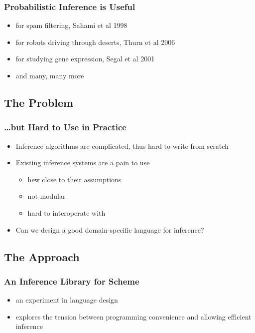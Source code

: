 \documentclass{beamer}
\begin{document}
\begin{frame}
  \frametitle{Probabilistic Inference is Useful}

  \begin{itemize}
  \item for spam filtering, Sahami et al 1998
  \item for robots driving through deserts, Thurn et al 2006
  \item for studying gene expression, Segal et al 2001
  \item and many, many more
  \end{itemize}
\end{frame}

\subsection{The Problem}

\begin{frame}
  \frametitle{\ldots but Hard to Use in Practice}

  \begin{itemize}
  \item Inference algorithms are complicated, thus hard to write from scratch
  \item Existing inference systems are a pain to use
    \begin{itemize}
    \item hew close to their assumptions
    \item not modular
    \item hard to interoperate with
    \end{itemize}
  \item Can we design a good domain-specific language for inference?
  \end{itemize}
\end{frame}

\subsection{The Approach}

\begin{frame}
  \frametitle{An Inference Library for Scheme}

  \begin{itemize}
  \item an experiment in language design
  \item explores the tension between programming convenience and
  allowing efficient inference
  \end{itemize}
\end{frame}
\end{document}

